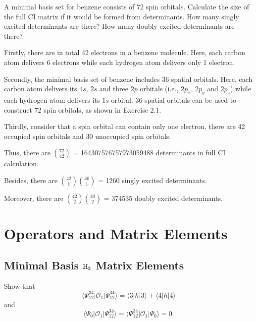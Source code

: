 \documentclass[a4paper]{book}
\begin{document}
	\begin{exercise}
	A minimal basis set for benzene consists of 72 spin orbitals. Calculate the size of the full CI matrix if it would be formed from determinants. How many singly excited determinants are there? How many doubly excited determinants are there?
	\end{exercise}
	
	\begin{solution}
	Firstly, there are in total 42 electrons in a benzene molecule. Here, each carbon atom delivers 6 electrons while each hydrogen atom delivers only 1 electron. 
	
	Secondly, the minimal basis set of benzene includes 36 spatial orbitals. Here, each carbon atom delivers its $1s$, $2s$ and three $2p$ orbitals (i.e., $2p_x$, $2p_y$ and $2p_z$) while each hydrogen atom delivers its $1s$ orbital. 36 spatial orbitals can be used to construct 72 spin orbitals, as shown in Exercise 2.1.
	
	Thirdly, consider that a spin orbital can contain only one electron, there are 42 occupied spin orbitals and 30 unoccupied spin orbitals.
	
	Thus, there are $\binom{72}{42}$ = 164307576757973059488 determinants in full CI calculation.
	
	Besides, there are $\binom{42}{1} \binom{30}{1}$ = 1260 singly excited determinants.
	
	Moreover, there are $\binom{42}{2} \binom{30}{2}$ = 374535 doubly excited determinants.
	\end{solution}
	
	\section{Operators and Matrix Elements}
	
	\subsection{Minimal Basis \texorpdfstring{$\ce{H2}$}- Matrix Elements}
	
	\begin{exercise}
	Show that
	\[
		\langle \Psi^{34}_{12} | \mathscr{O}_1 | \Psi^{34}_{12} \rangle = \langle 3 | h | 3 \rangle + \langle 4 | h | 4 \rangle
	\]
	and
	\[
		\langle \Psi_0 | \mathscr{O}_1 | \Psi^{34}_{12} \rangle = \langle \Psi^{34}_{12} | \mathscr{O}_1 | \Psi_0 \rangle = 0.
	\]
	\end{exercise}
	
\end{document}
